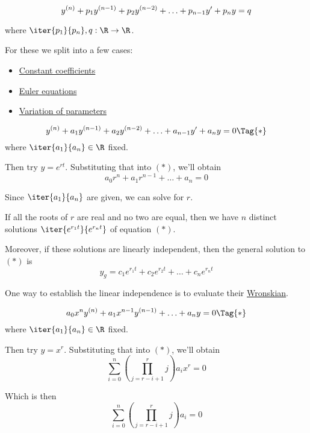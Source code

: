 
\begin{equation*}\def\y#1{y^{(#1)}}
	\y n+p_1\y{n-1}+p_2\y{n-2}+\ldots+p_{n-1}y'+p_ n y=q
\end{equation*}

where $\iter{p_1}{p_n},q:\R\to\R$.

For these we split into a few cases:
\begin{itemize}
	\item\href{cd8a29a}{Constant coefficients}
	\item\href{a0f8e0c}{Euler equations}
	\item\href{de785b7}{Variation of parameters}
\end{itemize}

\label{cd8a29a}

\begin{equation*}\def\y#1{y^{(#1)}}
  \y n+a_1\y{n-1}+a_2\y{n-2}+\ldots+a_{n-1}y'+a_ny=0\Tag{*}
\end{equation*}
where $\iter{a_1}{a_n}\in\R$ fixed.

Then try $y=e^{rt}$. Substituting that into $(*)$, we'll obtain
$$a_0r^n+a_1r^{n-1}+\ldots+a_n=0$$

Since $\iter{a_1}{a_n}$ are given, we can solve for $r$.

If all the roots of $r$ are real and no two are equal, then we have
$n$ distinct solutions $\iter{e^{r_1t}}{e^{r_nt}}$ of equation $(*)$.

Moreover, if these solutions are linearly independent, then the
general solution to $(*)$ is
$$y_g=c_1e^{r_1t}+c_2e^{r_2t}+\ldots+c_ne^{r_nt}$$

One way to establish the linear independence is to evaluate their
\href{b70073b}{Wronskian}.

\label{a0f8e0c}

\begin{equation*}\def\y#1{x^{#1}y^{(#1)}}
  a_0\y{n}+a_1\y{n-1}+\ldots+a_ny=0\Tag{*}
\end{equation*}
where $\iter{a_1}{a_n}\in\R$ fixed.

Then try $y=x^{r}$. Substituting that into $(*)$, we'll obtain
$$
	\sum_{i=0}^n\left(\prod_{j=r-i+1}^rj\right) a_ix^r=0
$$

Which is then
$$
	\sum_{i=0}^n\left(\prod_{j=r-i+1}^rj\right) a_i=0
$$

\label{de785b7}

